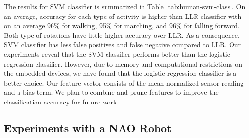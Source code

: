 \documentclass{IEEEtran}
\begin{document}
%

The results for SVM classifier is summarized in Table \ref{tab:human-svm-class}. On an average, 
accuracy for each type of activity is higher than LLR classifier with on an average 96\% for 
walking, 95\% for marching, and 96\% for falling forward. Both type of rotations have little higher accuracy over LLR. As a consequence, SVM classifier has less false positives and false negative compared to LLR.  Our experiments reveal that the SVM classifier performs better than the logistic regression classifier. However, due to memory and 
computational restrictions on the embedded devices, we have found that the logistic 
regression classifier is a better choice.  Our feature vector consists of the mean normalized sensor 
reading and a bias term. We plan to combine and prune features to improve the classification 
accuracy for future work.  


\subsection{Experiments with a NAO Robot}
\end{document}
